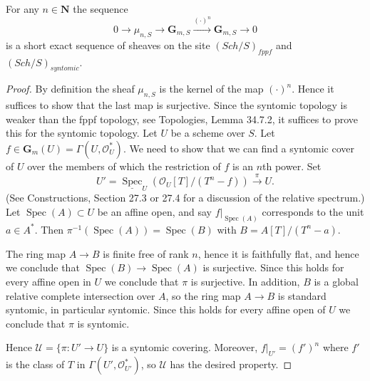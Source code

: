 \begin{lemma}[59.28.3]
For any $n\in\mathbf N$ the sequence
\[0\to\mu_{n,S}\to\mathbf G_{m,S}\xrightarrow{(\cdot)^n}\mathbf G_{m,S}\to0\]
is a short exact sequence of sheaves on the site $(\mathit{Sch}/S)_{fppf}$ and $(\mathit{Sch}/S)_{syntomic}$.
\end{lemma}
\begin{proof}
By definition the sheaf $\mu_{n,S}$ is the kernel of the map $(\cdot)^n$. Hence it suffices to show that the last map is surjective. Since the syntomic topology is weaker than the fppf topology, see Topologies, Lemma 34.7.2, it suffices to prove this for the syntomic topology. Let $U$ be a scheme over $S$. Let $f\in\mathbf G_m(U)=\Gamma(U,\mathcal O_U^*)$. We need to show that we can find a syntomic cover of $U$ over the members of which the restriction of $f$ is an $n$th power. Set
\[U'=\underline{\operatorname{Spec}}_U(\mathcal O_U[T]/(T^n-f))\xrightarrow{\pi}U.\]
(See Constructions, Section 27.3 or 27.4 for a discussion of the relative spectrum.) Let $\operatorname{Spec}(A)\subset U$ be an affine open, and say $f|_{\operatorname{Spec}(A)}$ corresponds to the unit $a\in A^*$. Then $\pi^{-1}(\operatorname{Spec}(A))=\operatorname{Spec}(B)$ with $B=A[T]/(T^n-a)$.

The ring map $A\to B$ is finite free of rank $n$, hence it is faithfully flat, and hence we conclude that $\operatorname{Spec}(B)\to\operatorname{Spec}(A)$ is surjective. Since this holds for every affine open in $U$ we conclude that $\pi$ is surjective. In addition, $B$ is a global relative complete intersection over $A$, so the ring map $A\to B$ is standard syntomic, in particular syntomic. Since this holds for every affine open of $U$ we conclude that $\pi$ is syntomic.

Hence $\mathcal U=\{\pi:U'\to U\}$ is a syntomic covering. Moreover, $f|_{U'}=(f')^n$ where $f'$ is the class of $T$ in $\Gamma(U',\mathcal O_{U'}^*)$, so $\mathcal U$ has the desired property.
\end{proof}

